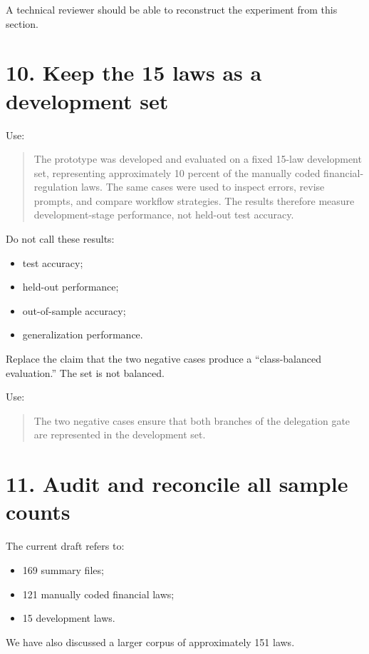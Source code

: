 \documentclass[11pt]{article}
\begin{document}
A technical reviewer should be able to reconstruct the experiment from this section.

\section*{10. Keep the 15 laws as a development set}

Use:

\begin{quote}
The prototype was developed and evaluated on a fixed 15-law development set, representing approximately 10 percent of the manually coded financial-regulation laws. The same cases were used to inspect errors, revise prompts, and compare workflow strategies. The results therefore measure development-stage performance, not held-out test accuracy.
\end{quote}

Do not call these results:

\begin{itemize}
    \item test accuracy;
    \item held-out performance;
    \item out-of-sample accuracy;
    \item generalization performance.
\end{itemize}

Replace the claim that the two negative cases produce a ``class-balanced evaluation.'' The set is not balanced.

Use:

\begin{quote}
The two negative cases ensure that both branches of the delegation gate are represented in the development set.
\end{quote}

\section*{11. Audit and reconcile all sample counts}

The current draft refers to:

\begin{itemize}
    \item 169 summary files;
    \item 121 manually coded financial laws;
    \item 15 development laws.
\end{itemize}

We have also discussed a larger corpus of approximately 151 laws.
\end{document}
